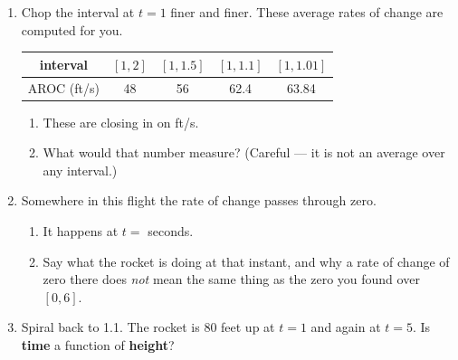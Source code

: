 \documentclass[10pt]{article}
\begin{document}
\boxguard[26]
\begin{tcolorbox}[colback=white, colframe=black!40,
    title=\textbf{Tier E --- Extension},
    fonttitle=\bfseries, arc=2mm, left=3mm, right=3mm, top=2mm, bottom=2mm]

\begin{enumerate}[itemsep=8pt]
  \item Chop the interval at $t = 1$ finer and finer. These average rates of
        change are computed for you.

        \smallskip
        \renewcommand{\arraystretch}{1.4}
        \begin{center}
        \begin{tabular}{|c|c|c|c|c|}
        \hline
        interval & $[1,2]$ & $[1,1.5]$ & $[1,1.1]$ & $[1,1.01]$ \\
        \hline
        AROC (ft/s) & 48 & 56 & 62.4 & 63.84 \\
        \hline
        \end{tabular}
        \end{center}
        \smallskip

        \begin{enumerate}[label=(\alph*), itemsep=4pt]
          \item These are closing in on \blank{2cm} ft/s.
          \item What would that number measure? (Careful --- it is not an
                average over any interval.)

                \vspace{0.05in}
        \end{enumerate}

  \item Somewhere in this flight the rate of change passes through zero.

        \begin{enumerate}[label=(\alph*), itemsep=4pt]
          \item It happens at $t = $ \blank{1.6cm} seconds.
          \item Say what the rocket is doing at that instant, and why a rate
                of change of zero there does \textit{not} mean the same thing
                as the zero you found over $[0,6]$.

                \vspace{0.05in}
        \end{enumerate}

  \item Spiral back to 1.1. The rocket is 80 feet up at $t = 1$ and again at
        $t = 5$. Is \textbf{time} a function of \textbf{height}?

        \vspace{0.05in}
\end{enumerate}
\end{tcolorbox}
\end{document}
